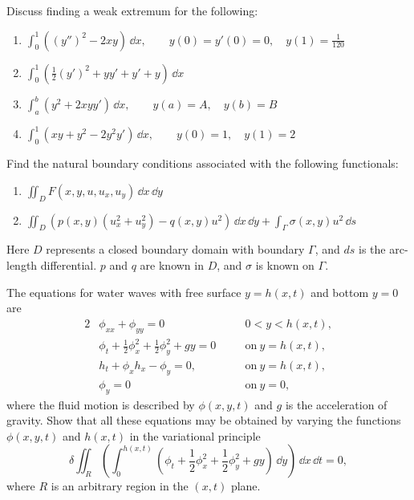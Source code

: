 \begin{Exercise}
  Discuss finding a weak extremum for the following:
  \begin{enumerate}
  \item
    $
    \int_0^1 \left( (y'')^2 - 2 x y \right)\,\dd x, \qquad
    y(0) = y'(0) = 0, \quad
    y(1) = \frac{1}{120}
    $
  \item
    $
    \int_0^1 \left( \frac{1}{2} (y')^2 + y y' + y' + y \right) \,\dd x
    $
  \item
    $
    \int_a^b ( y^2 + 2 x y y') \,\dd x, \qquad
    y(a) = A, \quad
    y(b) = B
    $
  \item
    $
    \int_0^1 (x y + y^2 - 2 y^2 y') \,\dd x, \qquad
    y(0) = 1, \quad
    y(1) = 2
    $
  \end{enumerate}
\end{Exercise}



\begin{Exercise}
  Find the natural boundary conditions associated with the following functionals:
  \begin{enumerate}
  \item
    $
    \iint_D F(x,y,u,u_x,u_y)\,\dd x\,\dd y
    $
  \item
    $
    \iint_D \left( p(x,y) (u_x^2 + u_y^2) - q(x,y) u^2 \right) \,\dd x\,\dd y
    + \int_\Gamma \sigma(x,y) u^2 \,\dd s
    $
  \end{enumerate}
  Here $D$ represents a closed boundary domain with boundary $\Gamma$, and 
  $d s$ is the arc-length differential.  $p$ and $q$ are known in $D$, and
  $\sigma$ is known on $\Gamma$.
\end{Exercise}



\begin{Exercise}
  The equations for water waves with free surface $y = h(x,t)$ and bottom
  $y = 0$ are
  \begin{alignat*}{2}
    &\phi_{x x} + \phi_{y y} = 0 &\quad &0 < y < h(x,t), \\
    &\phi_t + \frac{1}{2} \phi_x^2 + \frac{1}{2} \phi_y^2 + g y = 0 &\quad
    &\mathrm{on}\ y = h(x,t), \\
    &h_t + \phi_x h_x - \phi_y = 0, &\quad &\mathrm{on}\ y = h(x,t), \\
    &\phi_y = 0 &\quad &\mathrm{on}\ y = 0,
  \end{alignat*}
  where the fluid motion is described by $\phi(x,y,t)$ and $g$ is the 
  acceleration of gravity.  Show that all these equations may be obtained by 
  varying the functions $\phi(x,y,t)$ and $h(x,t)$ in the variational 
  principle
  \[
  \delta \iint_R \left( \int_0^{h(x,t)} \left( \phi_t + \frac{1}{2} \phi_x^2
      + \frac{1}{2} \phi_y^2 + g y \right) \,\dd y \right) \,\dd x \,\dd t = 0,
  \]
  where $R$ is an arbitrary region in the $(x,t)$ plane.
\end{Exercise}



